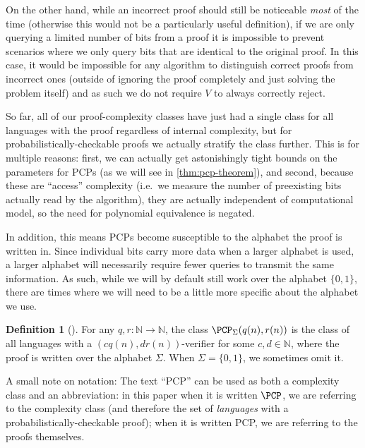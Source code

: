 \documentclass[english,12pt]{reedthesis}
\theoremstyle{plain}
\theoremstyle{definition}
\newtheorem{defn}[defn]{Definition}
\theoremstyle{remark}
\begin{document}
On the other hand, while an incorrect proof should still be noticeable
\emph{most} of the time (otherwise this would not be a particularly useful
definition), if we are only querying a limited number of bits from a proof it is
impossible to prevent scenarios where we only query bits that are identical to
the original proof. In this case, it would be impossible for any algorithm to
distinguish correct proofs from incorrect ones (outside of ignoring the proof
completely and just solving the problem itself) and as such we do not require
$V$ to always correctly reject.

So far, all of our proof-complexity classes have just had a single class for all
languages with the proof regardless of internal complexity, but for
probabilistically-checkable proofs we actually stratify the class further. This
is for multiple reasons: first, we can actually get astonishingly tight bounds
on the parameters for PCPs (as we will see in \cref{thm:pcp-theorem}), and
second, because these are ``access'' complexity (i.e.\ we measure the number of
preexisting bits actually read by the algorithm), they are actually independent
of computational model, so the need for polynomial equivalence is negated.

In addition, this means PCPs become susceptible to the alphabet the proof is
written in. Since individual bits carry more data when a larger alphabet is
used, a larger alphabet will necessarily require fewer queries to transmit the
same information. As such, while we will by default still work over the alphabet
$\{0, 1\}$, there are times where we will need to be a little more specific
about the alphabet we use.

\begin{defn}[{\cite[Def.\ 18.1]{AB09}}]\label{def:pcp}
  For any $q, r\colon \mathbb{N} \rightarrow \mathbb{N}$, the class $\PCP_{\Sigma}(q(n), r(n))$ is the class of all
  languages with a $(cq(n), dr(n))$-verifier for some $c, d \in \mathbb{N}$, where the
  proof is written over the alphabet $\Sigma$. When $\Sigma = \{0, 1\}$, we sometimes omit
  it.
\end{defn}

A small note on notation: The text ``PCP'' can be used as both a complexity
class and an abbreviation: in this paper when it is written $\PCP$, we are
referring to the complexity class (and therefore the set of \emph{languages}
with a probabilistically-checkable proof); when it is written PCP, we are
referring to the proofs themselves.
\end{document}
